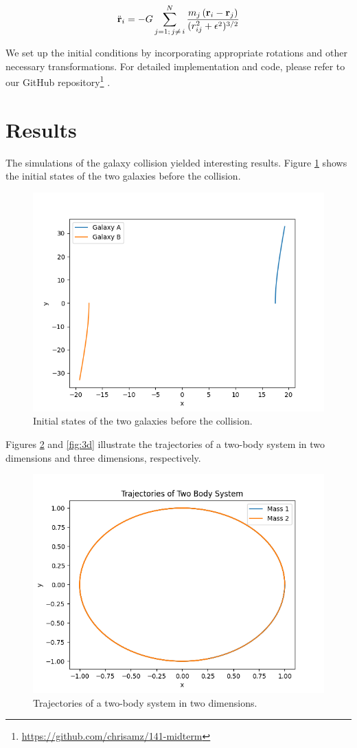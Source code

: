 \documentclass[reprint, amsmath, amssymb, aps]{revtex4-2}
\begin{document}
\begin{equation}
\ddot{{\bf r}}_i = -G \sum_{j=1;\, j \not = \,i}^N \frac{{m_j \, ({\bf r}_i - {\bf r}_j)}}{{(r_{ij}^2 + \epsilon^2)^{3/2}}}
\label{eq:general_motion}
\end{equation}

We set up the initial conditions by incorporating appropriate rotations and other necessary transformations. For detailed implementation and code, please refer to our GitHub repository\footnote{\url{https://github.com/chrisamz/141-midterm}} \cite{github}.

\section{Results}

The simulations of the galaxy collision yielded interesting results. Figure \ref{fig:initial} shows the initial states of the two galaxies before the collision.

\begin{figure}[htb]
    \centering
    \includegraphics[width=0.7\columnwidth]{figures/1.png}
    \caption{Initial states of the two galaxies before the collision.}
    \label{fig:initial}
\end{figure}

Figures \ref{fig:2d} and \ref{fig:3d} illustrate the trajectories of a two-body system in two dimensions and three dimensions, respectively.

\begin{figure}[htb]
    \centering
    \includegraphics[width=0.7\columnwidth]{figures/2.png}
    \caption{Trajectories of a two-body system in two dimensions.}
    \label{fig:2d}
\end{figure}
\end{document}
